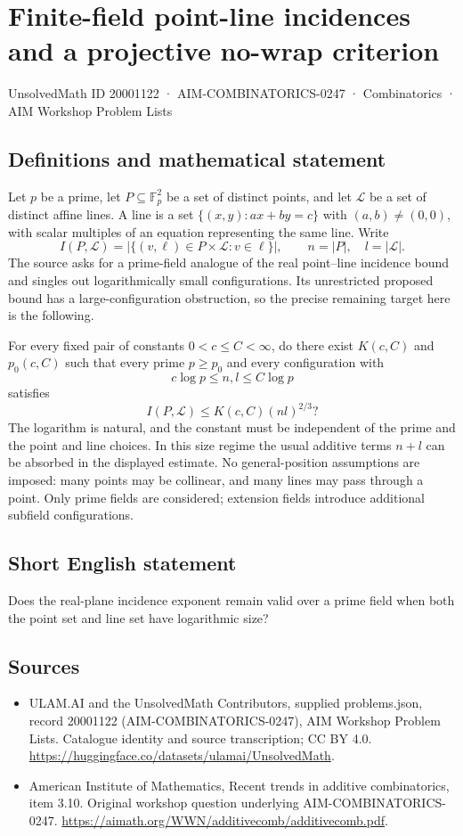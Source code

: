 \documentclass[11pt,a4paper]{article}
\begin{document}
\section*{Finite-field point-line incidences and a projective no-wrap criterion}\label{20001122}
{\small UnsolvedMath ID 20001122 · AIM-COMBINATORICS-0247 · Combinatorics · AIM Workshop Problem Lists}
\subsection{Definitions and mathematical statement}
Let $p$ be a prime, let $P\subseteq\mathbb F_p^2$ be a set of distinct points, and let $\mathcal L$ be a set of distinct affine lines.
A line is a set $\{(x,y):ax+by=c\}$ with $(a,b)\ne(0,0)$, with scalar multiples of an equation representing the same line.
Write
\[
 I(P,\mathcal L)=|\{(v,\ell)\in P\times\mathcal L:v\in\ell\}|,
 \qquad n=|P|,\quad l=|\mathcal L|.
\]
The source asks for a prime-field analogue of the real point--line incidence bound and singles out logarithmically small configurations.
Its unrestricted proposed bound has a large-configuration obstruction, so the precise remaining target here is the following.

For every fixed pair of constants $0<c\leq C<\infty$, do there exist $K(c,C)$ and $p_0(c,C)$ such that every prime $p\geq p_0$ and every configuration with
\[
 c\log p\leq n,l\leq C\log p
\]
satisfies
\[
 I(P,\mathcal L)\leq K(c,C)(nl)^{2/3}?
\]
The logarithm is natural, and the constant must be independent of the prime and the point and line choices.
In this size regime the usual additive terms $n+l$ can be absorbed in the displayed estimate.
No general-position assumptions are imposed: many points may be collinear, and many lines may pass through a point.
Only prime fields are considered; extension fields introduce additional subfield configurations.
\subsection{Short English statement}
Does the real-plane incidence exponent remain valid over a prime field when both the point set and line set have logarithmic size?
\subsection{Sources}
\begin{itemize}
\item[S1] ULAM.AI and the UnsolvedMath Contributors, supplied problems.json, record 20001122 (AIM-COMBINATORICS-0247), AIM Workshop Problem Lists. Catalogue identity and source transcription; CC BY 4.0.
\url{https://huggingface.co/datasets/ulamai/UnsolvedMath}.
\item[S2] American Institute of Mathematics, Recent trends in additive combinatorics, item 3.10. Original workshop question underlying AIM-COMBINATORICS-0247.
\url{https://aimath.org/WWN/additivecomb/additivecomb.pdf}.
\end{itemize}
\end{document}
